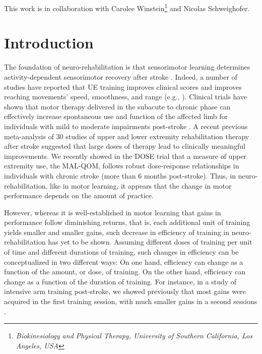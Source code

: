 This work is in collaboration with Carolee Winstein\footnote{\label{dosept}\textit{Biokinesiology and Physical Therapy, University of Southern California, Los Angeles, USA}} and Nicolas Schweighofer\footnotemark[\ref{dosept}]. 


\section{Introduction}
The foundation of neuro-rehabilitation is that sensorimotor learning determines activity-dependent sensorimotor recovery after stroke \cite{Kitago2013, Krakauer2006}. 
Indeed, a number of studies have reported that UE training improves clinical scores \cite{Cirstea2003, Kamper2002, Kwakkel2006, McCrea2005} and improves reaching movements’ speed, smoothness, and range (e.g., \cite{Anton1996}). 
Clinical trials have shown that motor therapy delivered in the subacute to chronic phase can effectively increase spontaneous use and function of the affected limb for individuals with mild to moderate impairments post-stroke \cite{Wolf2006, Lohse2014}. 
A recent previous meta-analysis of 30 studies of upper and lower extremity rehabilitation therapy after stroke suggested that large doses of therapy lead to clinically meaningful improvements. 
We recently showed in the DOSE trial that a measure of upper extremity use, the MAL-QOM, follows robust dose-response relationships in individuals with chronic stroke (more than 6 months post-stroke). 
Thus, in neuro-rehabilitation, like in motor learning, it appears that the change in motor performance depends on the amount of practice. 

However, whereas it is well-established in motor learning that gains in performance follow diminishing returns, that is, each additional unit of training yields smaller and smaller gains, such decrease in efficiency of training in neuro-rehabilitation has yet to be shown. 
Assuming different doses of training per unit of time and different durations of training, such changes in efficiency can be conceptualized in two different ways: On one hand, efficiency can change as a function of the amount, or dose, of training. 
On the other hand, efficiency can change as a function of the duration of training. 
For instance, in a study of intensive arm training post-stroke, we showed previously that most gains were acquired in the first training session, with much smaller gains in a second sessions \cite{Park2016}.

